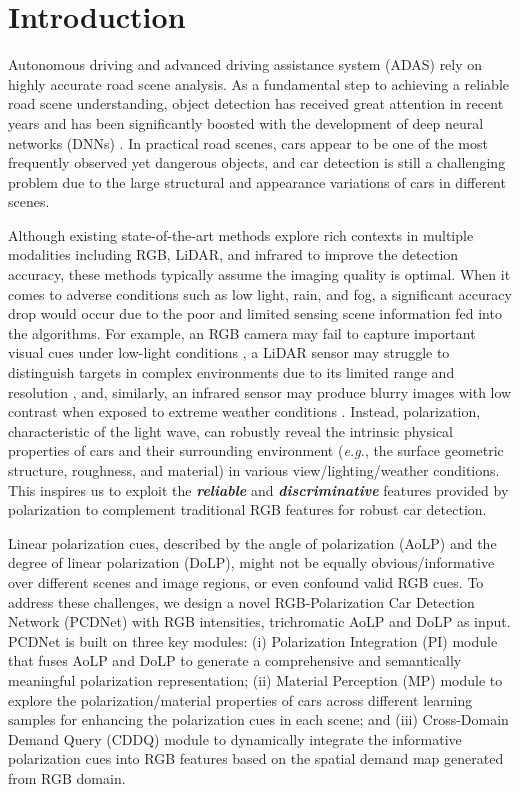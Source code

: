 \section{Introduction}
\label{sec:introduction}
Autonomous driving and advanced driving assistance system (ADAS) rely on highly accurate road scene analysis. As a fundamental step to achieving a reliable road scene understanding, object detection has received great attention in recent years and has been significantly boosted with the development of deep neural networks (DNNs) \cite{lin2017focal, redmon2018yolov3, sun2021sparse}. In practical road scenes, cars appear to be one of the most frequently observed yet dangerous objects, and car detection is still a challenging problem due to the large structural and appearance variations of cars in different scenes.

Although existing state-of-the-art methods explore rich contexts in multiple modalities including RGB, LiDAR, and infrared to improve the detection accuracy, these methods typically assume the imaging quality is optimal. When it comes to adverse conditions such as low light, rain, and fog, a significant accuracy drop would occur due to the poor and limited sensing scene information fed into the algorithms. For example, an RGB camera may fail to capture important visual cues under low-light conditions \cite{song2019vision, arora2022automatic}, a LiDAR sensor may struggle to distinguish targets in complex environments due to its limited range and resolution \cite{Qian_2021_CVPR, chen2020pseudo}, and, similarly, an infrared sensor may produce blurry images with low contrast when exposed to extreme weather conditions \cite{du2021weak, sun2022drone}. Instead, polarization, characteristic of the light wave, can robustly reveal the intrinsic physical properties of cars and their surrounding environment (\textit{e.g.}, the surface geometric structure, roughness, and material) in various view/lighting/weather conditions. This inspires us to exploit the \textbf{\textit{reliable}} and \textbf{\textit{discriminative}} features provided by polarization to complement traditional RGB features for robust car detection.

Linear polarization cues, described by the angle of polarization (AoLP) and the degree of linear polarization (DoLP), might not be equally obvious/informative over different scenes and image regions, or even confound valid RGB cues. To address these challenges, we design a novel RGB-Polarization Car Detection Network (PCDNet) with RGB intensities, trichromatic AoLP and DoLP as input.
PCDNet is built on three key modules: (i) Polarization Integration (PI) module that fuses AoLP and DoLP to generate a comprehensive and semantically meaningful polarization representation; (ii) Material Perception (MP) module to explore the polarization/material properties of cars across different learning samples for enhancing the polarization cues in each scene; and (iii) Cross-Domain Demand Query (CDDQ) module to dynamically integrate the informative polarization cues into RGB features based on the spatial demand map generated from RGB domain.

